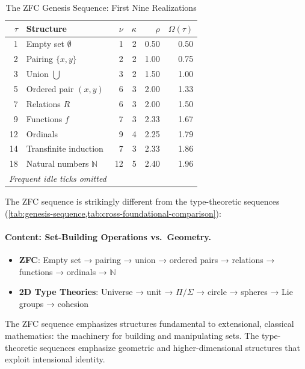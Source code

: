 \documentclass[11pt]{article}
\theoremstyle{definition}
\theoremstyle{remark}
\begin{document}
\begin{table}[htbp]
\centering
\caption{The ZFC Genesis Sequence: First Nine Realizations}
\label{tab:zfc-genesis}
\begin{tabular}{@{}rlrrrr@{}}
\hline
$\tau$ & \textbf{Structure} & $\nu$ & $\kappa$ & $\rho$ & $\Omega(\tau)$ \\
\hline
1 & Empty set $\emptyset$ & 1 & 2 & 0.50 & 0.50 \\
2 & Pairing $\{x,y\}$ & 2 & 2 & 1.00 & 0.75 \\
3 & Union $\bigcup$ & 3 & 2 & 1.50 & 1.00 \\
5 & Ordered pair $(x,y)$ & 6 & 3 & 2.00 & 1.33 \\
7 & Relations $R$ & 6 & 3 & 2.00 & 1.50 \\
9 & Functions $f$ & 7 & 3 & 2.33 & 1.67 \\
12 & Ordinals & 9 & 4 & 2.25 & 1.79 \\
14 & Transfinite induction & 7 & 3 & 2.33 & 1.86 \\
18 & Natural numbers $\mathbb{N}$ & 12 & 5 & 2.40 & 1.96 \\
\hline
\multicolumn{2}{l}{\textit{Frequent idle ticks omitted}} & \multicolumn{4}{l}{} \\
\hline
\end{tabular}
\end{table}

The ZFC sequence is strikingly different from the type-theoretic sequences (\cref{tab:genesis-sequence,tab:cross-foundational-comparison}):

\paragraph{Content: Set-Building Operations vs.\ Geometry.}
\begin{itemize}
\item \textbf{ZFC}: Empty set → pairing → union → ordered pairs → relations → functions → ordinals → $\mathbb{N}$
\item \textbf{2D Type Theories}: Universe → unit → $\Pi/\Sigma$ → circle → spheres → Lie groups → cohesion
\end{itemize}

The ZFC sequence emphasizes structures fundamental to extensional, classical mathematics: the machinery for building and manipulating sets. The type-theoretic sequences emphasize geometric and higher-dimensional structures that exploit intensional identity.
\end{document}
